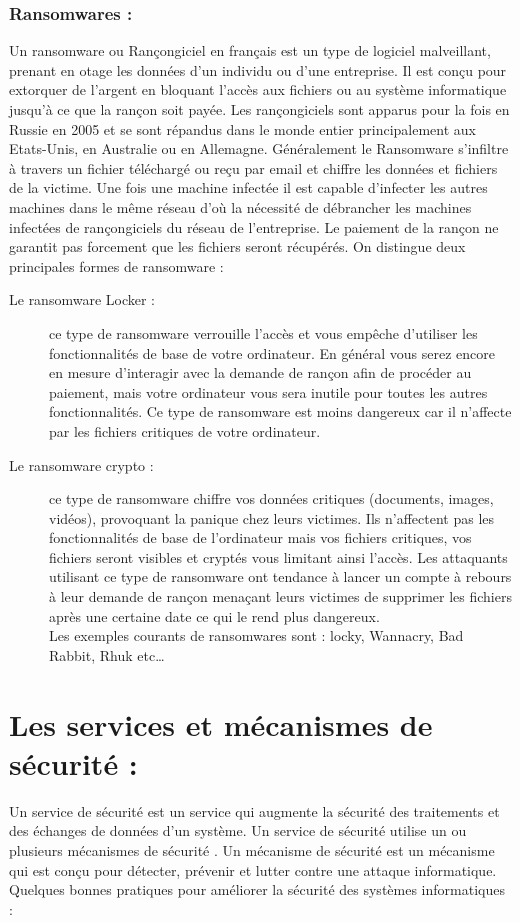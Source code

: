 \subsubsection{Ransomwares : }
Un ransomware ou Rançongiciel en français est un type de logiciel malveillant, prenant en otage les données d'un individu ou d'une entreprise. Il est conçu pour extorquer de l'argent en bloquant l'accès aux fichiers ou au système informatique jusqu'à ce que la rançon soit payée. Les rançongiciels sont apparus pour la fois en Russie en 2005 \cite{ref13} et se sont répandus dans le monde entier principalement aux Etats-Unis, en Australie ou en Allemagne. Généralement le Ransomware s’infiltre à travers un fichier téléchargé ou reçu par email et chiffre les données et fichiers de la victime. Une fois une machine infectée il est capable d’infecter les autres machines dans le même réseau d’où la nécessité de débrancher les machines infectées de rançongiciels du réseau de l’entreprise.
\ransom
Le paiement de la rançon ne garantit pas forcement que les fichiers seront récupérés. On distingue deux principales formes de ransomware :
\begin{description}
 \item[Le ransomware Locker : ] ce type de ransomware verrouille l’accès et vous empêche d’utiliser les fonctionnalités de base de votre ordinateur. En général vous serez encore en mesure d’interagir avec la demande de rançon afin de procéder au paiement, mais votre ordinateur vous sera inutile pour toutes les autres fonctionnalités. Ce type de ransomware est moins dangereux car il n’affecte par les fichiers critiques de votre ordinateur.
 \item[Le ransomware crypto : ]  ce type de ransomware chiffre vos données critiques (documents, images, vidéos), provoquant la panique chez leurs victimes. Ils n’affectent pas les fonctionnalités de base de l’ordinateur mais vos fichiers critiques, vos fichiers seront visibles et cryptés vous limitant ainsi l’accès. Les attaquants utilisant ce type de ransomware ont tendance à lancer un compte à rebours à leur demande de rançon menaçant leurs victimes de supprimer les fichiers après une certaine date ce qui le rend plus dangereux.\\
Les exemples courants de ransomwares sont : locky, Wannacry, Bad Rabbit, Rhuk etc…
 \end{description} 
\section{Les services et mécanismes de sécurité : } 
Un service de sécurité est un service qui augmente la sécurité des traitements et des échanges de données d’un système. Un service de sécurité utilise un ou plusieurs mécanismes de sécurité \cite{ref15}. Un mécanisme de sécurité est un mécanisme qui est conçu pour détecter, prévenir et lutter contre une attaque informatique.
Quelques bonnes pratiques pour améliorer la sécurité des systèmes informatiques :
